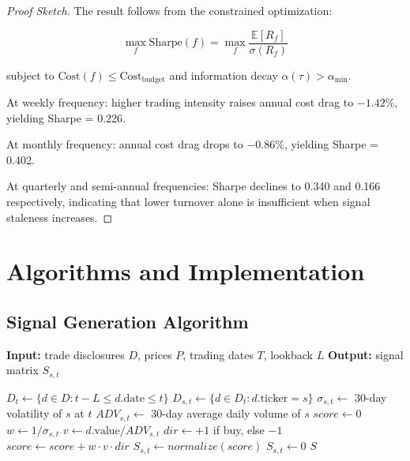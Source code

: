 \documentclass[twocolumn,ieee]{Base_Latex_Template/arithmaxresearch}
\begin{document}
\begin{proof}[Proof Sketch]
The result follows from the constrained optimization:

$$\max_f \text{Sharpe}(f) = \max_f \frac{\mathbb{E}[R_f]}{\sigma(R_f)}$$

subject to $\text{Cost}(f) \leq \text{Cost}_{\text{budget}}$ and information decay $\alpha(\tau) > \alpha_{\text{min}}$.

At weekly frequency: higher trading intensity raises annual cost drag to $-1.42\%$, yielding Sharpe = 0.226.

At monthly frequency: annual cost drag drops to $-0.86\%$, yielding Sharpe = 0.402.

At quarterly and semi-annual frequencies: Sharpe declines to 0.340 and 0.166 respectively, indicating that lower turnover alone is insufficient when signal staleness increases.
\end{proof}

\section{Algorithms and Implementation}


\subsection{Signal Generation Algorithm}

\begin{algorithm}[H]
\caption{Congressional Signal Generation}
\label{alg:signal_generation}
\begin{algorithmic}[1]
\State \textbf{Input:} trade disclosures $D$, prices $P$, trading dates $T$, lookback $L$
\State \textbf{Output:} signal matrix $S_{s,t}$

    \State $D_t \gets \{d \in D : t-L \leq d.\text{date} \leq t\}$
        \State $D_{s,t} \gets \{d \in D_t : d.\text{ticker}=s\}$
            \State $\sigma_{s,t} \gets$ 30-day volatility of $s$ at $t$
            \State $ADV_{s,t} \gets$ 30-day average daily volume of $s$
            \State $score \gets 0$
                \State $w \gets 1 / \sigma_{s,t}$
                \State $v \gets d.\text{value} / ADV_{s,t}$
                \State $dir \gets +1$ if buy, else $-1$
                \State $score \gets score + w \cdot v \cdot dir$
            \EndFor
            \State $S_{s,t} \gets normalize(score)$
        \Else
            \State $S_{s,t} \gets 0$
        \EndIf
    \EndFor
\EndFor
\State \Return $S$
\end{algorithmic}
\end{algorithm}
\end{document}
